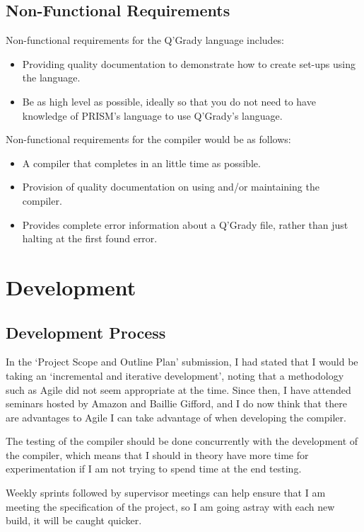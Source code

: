 \documentclass[11pt, a4paper]{article}
\begin{document}
\subsection{Non-Functional Requirements} %
\label{sub:non_functional_requirements}
Non-functional requirements for the Q'Grady language includes:
\begin{itemize}
    \item Providing quality documentation to demonstrate how to create set-ups
    using the language.
    \item Be as high level as possible, ideally so that you do not need to
    have knowledge of PRISM's language to use Q'Grady's language.
\end{itemize}
Non-functional requirements for the compiler would be as follows:
\begin{itemize}
    \item A compiler that completes in an little time as possible.
    \item Provision of quality documentation on using and/or maintaining the
    compiler.
    \item Provides complete error information about a Q'Grady file, rather than
    just halting at the first found error.
\end{itemize}


\section{Development} %
\label{sec:development}
\subsection{Development Process} %
\label{sub:development_process}
In the `Project Scope and Outline Plan' submission, I had stated that I would
be taking an `incremental and iterative development', noting that a methodology
such as Agile did not seem appropriate at the time. Since then, I have attended
seminars hosted by Amazon and Baillie Gifford, and I do now think that there
are advantages to Agile I can take advantage of when developing the compiler.

The testing of the compiler should be done concurrently with the development of
the compiler, which means that I should in theory have more time for
experimentation if I am not trying to spend time at the end testing.

Weekly sprints followed by supervisor meetings can help ensure that I am meeting
the specification of the project, so I am going astray with each new build, it
will be caught quicker.
\end{document}
